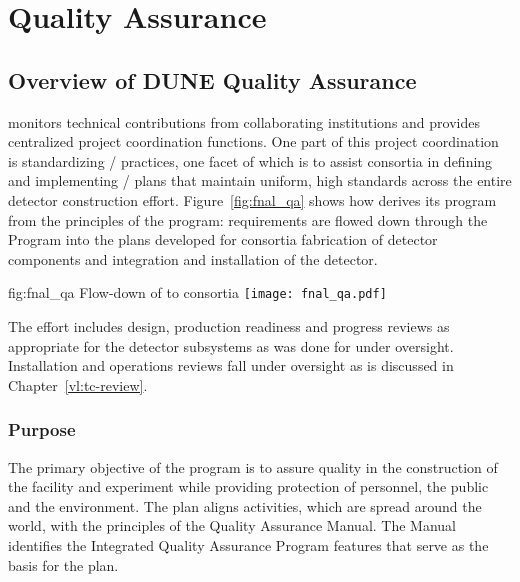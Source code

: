 \chapter{Quality Assurance}
\label{vl:tc-QA}

\section{Overview of DUNE Quality Assurance}

  monitors technical contributions from
collaborating institutions and provides centralized project
coordination functions. One part of this project coordination is
standardizing / practices, one facet
of which is to assist consortia in defining and implementing
/ plans that maintain uniform, high
standards across the entire detector construction
effort. Figure~\ref{fig:fnal_qa} shows how  
derives its  program from the principles of the \fnal {} program:
requirements are flowed down through the 
 Program into the  plans developed for consortia fabrication of
detector components and integration and installation of the detector.
\begin{dunefigure}[\fnal QA]{fig:fnal_qa}
  {Flow-down of \fnal {} to consortia}
  \texttt{[image: fnal\_qa.pdf]}
\end{dunefigure}
The  effort includes design, production readiness and
progress reviews as appropriate for the  detector
subsystems as was done for  under 
oversight. Installation and operations reviews fall under 
oversight as is discussed in Chapter~\ref{vl:tc-review}.

\subsection{Purpose}

The primary objective of the   program is
to assure quality in the construction of the  facility and
 experiment while providing protection of
 personnel, the public and the environment. The
 plan aligns   activities, which
are spread around the world, with the principles of the \fnal Quality
Assurance Manual. The Manual identifies the \fnal Integrated Quality
Assurance Program features that serve as the basis for the
  plan.

